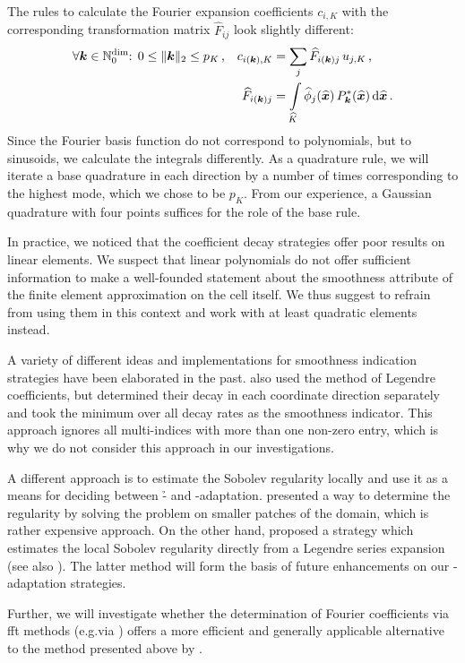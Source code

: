 The rules to calculate the Fourier expansion coefficients $c_{i,K}$ with the corresponding transformation matrix $\widehat{F}_{ij}$ look slightly different:
\begin{align}
&\forall \tuple{k} \in \mathbb{N}_0^\text{dim} \text{: } 0 \leq \|\tuple{k}\|_2 \leq p_K \, \text{,} &
c_{i(\tuple{k}),K} &= \sum\limits_j \widehat{F}_{i(\tuple{k})j} \, u_{j,K} \,\text{,} \\
&& \widehat{F}_{i(\tuple{k})j} &= \int\limits_{\widehat{K}} \widehat{\phi}_j(\vec{\widehat{x}}) \, P_\tuple{k}^\ast(\vec{\widehat{x}}) \differential{\vec{\widehat{x}}} \,\text{.}
\end{align}
Since the Fourier basis function do not correspond to polynomials, but to sinusoids, we calculate the integrals differently. As a quadrature rule, we will iterate a base quadrature in each direction by a number of times corresponding to the highest mode, which we chose to be $p_K$. From our experience, a Gaussian quadrature with four points suffices for the role of the base rule.

In practice, we noticed that the coefficient decay strategies offer poor results on linear elements. We suspect that linear polynomials do not offer sufficient information to make a well-founded statement about the smoothness attribute of the finite element approximation on the cell itself. We thus suggest to refrain from using them in this context and work with at least quadratic elements instead.

A variety of different ideas and implementations for smoothness indication strategies have been elaborated in the past. \textcite{davydov2017} also used the method of Legendre coefficients, but determined their decay in each coordinate direction separately and took the minimum over all decay rates as the smoothness indicator. This approach ignores all multi-indices with more than one non-zero entry, which is why we do not consider this approach in our investigations.

A different approach is to estimate the Sobolev regularity locally and use it as a means for deciding between \h- and \p-adaptation. \textcite{ainsworth1998} presented a way to determine the regularity by solving the problem on smaller patches of the domain, which is rather expensive approach. On the other hand, \textcite{houston2003} proposed a strategy which estimates the local Sobolev regularity directly from a Legendre series expansion (see also \textcite[Sec.~2.4]{houston2005}). The latter method will form the basis of future enhancements on our \hp-adaptation strategies.

Further, we will investigate whether the determination of Fourier coefficients via \gls{fft} methods (e.g.\@ via \fftw{} \textcite{fftw338}) offers a more efficient and generally applicable alternative to the method presented above by \textcite{bangerth2009}.